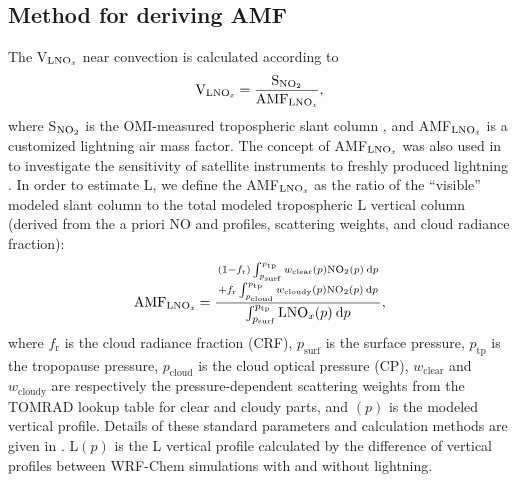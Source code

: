 \documentclass[amt]{copernicus}
\begin{document}
\subsection{Method for deriving AMF} \label{section:AMF}
The V$_\chem{LNO_\mathit{x}}$ near convection is calculated according to
\begin{equation}
\mathrm{V}_\chem{LNO_\mathit{x}} = \frac{\mathrm{S}_\chem{NO_2}}{\mathrm{AMF}_\chem{LNO_\mathit{x}}},
\end{equation}
where S$_\chem{NO_2}$ is the OMI-measured tropospheric slant column , and AMF$_\chem{LNO_\mathit{x}}$ is a customized lightning air mass factor.
The concept of AMF$_\chem{LNO_\mathit{x}}$ was also used in \citet{Beirle.2009} to investigate the sensitivity of satellite instruments to freshly produced lightning .
In order to estimate L, we define the AMF$_\chem{LNO_\mathit{x}}$ as the ratio of the ``visible'' modeled  slant column to the total modeled tropospheric L vertical column (derived from the a priori NO and  profiles, scattering weights, and cloud radiance fraction):
\begin{equation} \label{AMFLNOx}
\mathrm{AMF}_{\chem{LNO_\mathit{x}}} = \displaystyle{{(1-f_\mathrm{r}) \int_{p_\mathrm{surf}}^{p_\mathrm{tp}} w_\mathrm{clear}(p) \chem{NO_2}(p) \: \mathrm{d}p \atop + f_\mathrm{r} \int_{p_\mathrm{cloud}}^{p_\mathrm{tp}} w_\mathrm{cloudy}(p) \chem{NO_2}(p) \: \mathrm{d}p} \over{\int_{p_\mathrm{surf}}^{p_\mathrm{tp}} \chem{LNO_\mathit{x}}(p) \: \mathrm{d}p}},
\end{equation}
where $f_\mathrm{r}$ is the cloud radiance fraction (CRF), $p_\mathrm{surf}$ is the surface pressure, $p_\mathrm{tp}$ is the tropopause pressure, $p_\mathrm{cloud}$ is the cloud optical pressure (CP), $w_\mathrm{clear}$ and $w_\mathrm{cloudy}$ are respectively the pressure-dependent scattering weights from the TOMRAD lookup table \citep{Bucsela.2013} for clear and cloudy parts, and $(p)$ is the modeled  vertical profile. Details of these standard parameters and calculation methods are given in \citet{Laughner.2018}.
L$(p)$ is the L vertical profile calculated by the difference of vertical profiles between WRF-Chem simulations with and without lightning.
\end{document}
